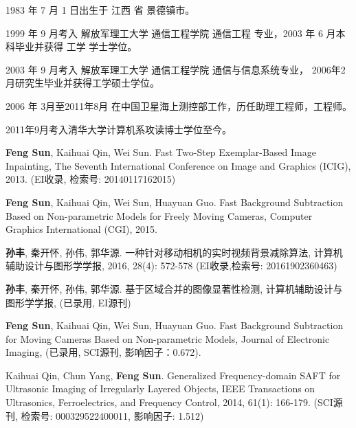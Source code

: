 \begin{resume}


  1983 年 7 月 1 日出生于 江西 省 景德镇市。

  1999 年 9 月考入 解放军理工大学 通信工程学院  通信工程 专业，2003 年 6 月本科毕业并获得 工学 学士学位。

  2003 年 9 月考入 解放军理工大学 通信工程学院 通信与信息系统专业， 2006年2月研究生毕业并获得工学硕士学位。

  2006 年 3月至2011年8月 在中国卫星海上测控部工作，历任助理工程师，工程师。

  2011年9月考入清华大学计算机系攻读博士学位至今。




  \begin{publications}
    \item {\bf Feng Sun}, Kaihuai Qin, Wei Sun. Fast Two-Step Exemplar-Based Image Inpainting,
   The Seventh International Conference on Image and Graphics (ICIG), 2013. (EI收录, 检索号: 20140117162015)
    \item  {\bf Feng Sun}, Kaihuai Qin, Wei Sun, Huayuan Guo. Fast Background Subtraction Based on Non-parametric Models for Freely Moving Cameras,
    Computer Graphics International (CGI), 2015.
    \item {\bf 孙丰}, 秦开怀, 孙伟, 郭华源. 一种针对移动相机的实时视频背景减除算法, 计算机辅助设计与图形学学报, 2016, 28(4): 572-578 (EI收录,检索号: 20161902360463)
  \end{publications}

  \begin{publications}[before=\publicationskip,after=\publicationskip]

    \item {\bf 孙丰}, 秦开怀, 孙伟, 郭华源. 基于区域合并的图像显著性检测, 计算机辅助设计与图形学学报, (已录用, EI源刊)
    \item  {\bf Feng Sun}, Kaihuai Qin, Wei Sun, Huayuan Guo. Fast Background Subtraction for Moving Cameras Based on Non-parametric Models,
    Journal of Electronic Imaging, (已录用, SCI源刊, 影响因子：0.672).
  \end{publications}

  \begin{publications}
    \item  Kaihuai Qin, Chun Yang, {\bf Feng Sun}. Generalized Frequency-domain SAFT for Ultrasonic Imaging of Irregularly Layered Objects,
    IEEE Transactions on Ultrasonics, Ferroelectrics, and Frequency Control, 2014, 61(1): 166-179. (SCI源刊, 检索号: 000329522400011, 影响因子: 1.512)





\end{publications}
\end{resume}

